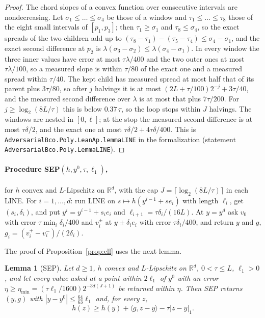 \documentclass[11pt]{amsart}
\newtheorem{lemma}[theorem]{Lemma}
\theoremstyle{definition}
\numberwithin{equation}{section}
\newcommand{\R}{\mathbb{R}}
\newcommand{\ip}[1]{\langle #1\rangle}
\begin{document}
\begin{proof}
The chord slopes of a convex function over consecutive intervals are nondecreasing. Let $\sigma_1\le\dots\le\sigma_4$ be those of a window and $\tau_1\le\dots\le\tau_8$ those of the eight small intervals of $[p_1,p_3]$; then $\tau_1\ge\sigma_1$ and $\tau_8\le\sigma_4$, so the exact spreads of the two children add up to $(\tau_8-\tau_1)-(\tau_5-\tau_4)\le\sigma_4-\sigma_1$, and the exact second difference at $p_2$ is $\lambda(\sigma_3-\sigma_2)\le\lambda(\sigma_4-\sigma_1)$. In every window the three inner values have error at most $\tau\lambda/400$ and the two outer ones at most $\tau\lambda/100$, so a measured slope is within $\tau/80$ of the exact one and a measured spread within $\tau/40$. The kept child has measured spread at most half that of its parent plus $3\tau/80$, so after $j$ halvings it is at most $(2L+\tau/100)2^{-j}+3\tau/40$, and the measured second difference over $\lambda$ is at most that plus $7\tau/200$. For $j\ge\log_2(8L/\tau)$ this is below $0.37\,\tau$, so the loop stops within $J$ halvings. The windows are nested in $[0,\ell]$; at the stop the measured second difference is at most $\tau\delta/2$, and the exact one at most $\tau\delta/2+4\tau\delta/400$.
This is \texttt{AdversarialBco.Poly.LeanAp.lemmaLINE} in the formalization (statement \texttt{AdversarialBco.Poly.LemmaLINE}).
\end{proof}

\paragraph{Procedure SEP$(h,y^0,\tau,\ell_1)$,} for $h$ convex and $L$-Lipschitz on $\R^d$, with the cap $J=\lceil\log_2(8L/\tau)\rceil$ in each LINE. For $i=1,\dots,d$: run LINE on $s\mapsto h(y^{i-1}+se_i)$ with length $\ell_i$, get $(s_i,\delta_i)$, and put $y^i=y^{i-1}+s_ie_i$ and $\ell_{i+1}=\tau\delta_i/(16L)$. At $y=y^d$ ask $v_0$ with error $\tau\min_i\delta_i/400$ and $v_i^\pm$ at $y\pm\delta_ie_i$ with error $\tau\delta_i/400$, and return $y$ and $g$, $g_i=(v_i^+-v_i^-)/(2\delta_i)$.

The proof of Proposition~\ref{prop:ell} uses the next lemma.

\begin{lemma}[SEP]\label{lem:sep}
Let $d\ge1$, $h$ convex and $L$-Lipschitz on $\R^d$, $0<\tau\le L$, $\ell_1>0$, and let every value asked at a point within $2\ell_1$ of $y^0$ with an error $\eta\ge\eta_{\min}=(\tau\ell_1/1600)2^{-3d(J+1)}$ be returned within $\eta$. Then SEP returns $(y,g)$ with $|y-y^0|\le\frac{64}{63}\ell_1$ and, for every $z$,
\[
h(z)\ge h(y)+\ip{g,z-y}-\tau|z-y|_1 .
\]
\end{lemma}
\end{document}
